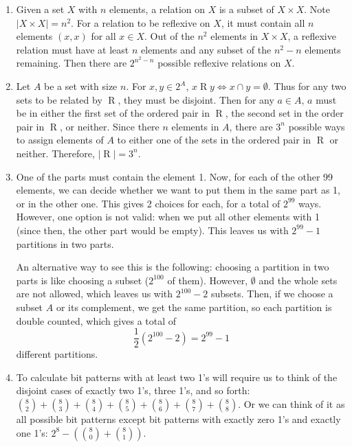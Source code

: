 \documentclass{article}
\theoremstyle{definition}
\begin{document}
\begin{solution}
    	\begin{enumerate}
	\item Given a set $X$ with $n$ elements, a relation on $X$ is a subset of $X\times X$. Note $|X\times X| = n^2$. For a relation to be reflexive on $X$, it must contain all $n$ elements $(x, x)$ for all $x\in X$. Out of the $n^2$ elements in $X\times X$, a reflexive relation must have at least $n$ elements and any subset of the $n^2-n$ elements remaining. Then there are $2^{n^2-n}$ possible reflexive relations on $X$.
	
	\item Let $A$ be a set with size $n$. For $x, y \in 2^{A}$, $x\mathrel{R}y \iff x \cap y = \emptyset$. Thus for any two sets to be related by $\mathrel{R}$, they must be disjoint. Then for any $a\in A$, $a$ must be in either the first set of the ordered pair in $\mathrel{R}$, the second set in the order pair in $\mathrel{R}$, or neither. Since there $n$ elements in $A$, there are $3^n$ possible ways to assign elements of $A$ to either one of the sets in the ordered pair in $\mathrel{R}$ or neither. Therefore, $|\mathrel{R}|=3^n$. 

   	 \item One of the parts must contain the element 1. Now, for each of the other 99 elements, we can decide whether we want to put them in the same part as 1, or in the other one. This gives 2 choices for each, for a total of $2^{99}$ ways. However, one option is not valid: when we put all other elements with 1 (since then, the other part would be empty). This leaves us with $2^{99} - 1$ partitions in two parts.
	
	An alternative way to see this is the following: choosing a partition in two parts is like choosing a subset ($2^{100}$ of them). However, $\emptyset$ and the whole sets are not allowed, which leaves us with $2^{100} - 2$ subsets. Then, if we choose a subset $A$ or its complement, we get the same partition, so each partition is double counted, which gives a total of
	\[
	\frac12 \left ( 2^{100} - 2 \right ) = 2^{99} - 1
	\]
	different partitions.


        \item To calculate bit patterns with at least two 1's will require us to think of the disjoint cases of exactly two 1's, three 1's, and so forth: $\binom{8}{2} + \binom{8}{3} + \binom{8}{4} + \binom{8}{5} + \binom{8}{6} + \binom{8}{7} + \binom{8}{8} $. Or we can think of it as all possible bit patterns except bit patterns with exactly zero 1's and exactly one 1's: $2^8 - \left(\binom{8}{0}+\binom{8}{1}\right)$.
        

\end{enumerate}
\end{solution}
\end{document}
